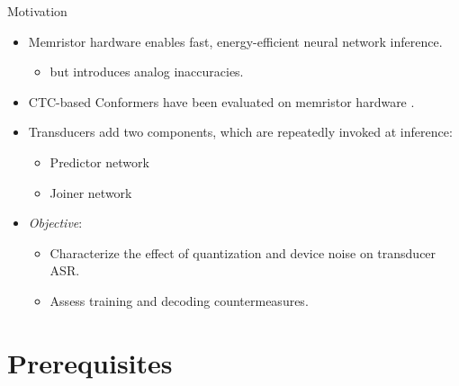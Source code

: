 \documentclass[xcolor=table,mathserif,9pt,usepdftitle=false]{beamer}    %
\begin{document}
\begin{frame}{Motivation}
  \begin{itemize}
    \setlength{\itemsep}{10pt}
    \item Memristor hardware enables fast, energy-efficient neural network inference.
          \begin{itemize}
            \item[$\rightarrow$] but introduces analog inaccuracies.
          \end{itemize}
    \item CTC-based Conformers have been evaluated on memristor hardware \cite{rossenbach2025memristor}.
    \item Transducers add two components, which are repeatedly invoked at inference:
          \begin{itemize}
            \item Predictor network
            \item Joiner network
          \end{itemize}
    \item \emph{Objective}:
          \begin{itemize}
            \item Characterize the effect of quantization and device noise on transducer ASR.
            \item Assess training and decoding countermeasures.
          \end{itemize}
  \end{itemize}
\end{frame}

\section{Prerequisites}
\end{document}
